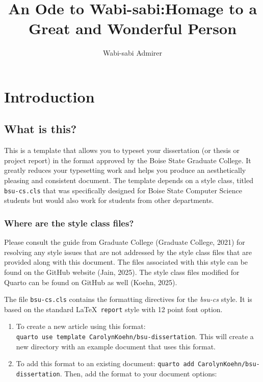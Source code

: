 \documentclass[
  dissertation]{bsu-cs}
\title{An Ode to Wabi-sabi:\titleBreak Homage to a Great and Wonderful
Person}
\author{Wabi-sabi Admirer}
\providecommand{\tightlist}{%
  \setlength{\itemsep}{0pt}\setlength{\parskip}{0pt}}\usepackage{longtable,booktabs,array}
\begin{document}
\frontmatter

\buildFrontPages










\mainmatter

\chapter{Introduction} \label{ch-intro}

\section{What is this?}\label{what-is-this}

This is a template that allows you to typeset your dissertation (or
thesis or project report) in the format approved by the Boise State
Graduate College. It greatly reduces your typesetting work and helps you
produce an aesthetically pleasing and consistent document. The template
depends on a style class, titled \texttt{bsu-cs.cls} that was
specifically designed for Boise State Computer Science students but
would also work for students from other departments.

\subsection{Where are the style class
files?}\label{where-are-the-style-class-files}

Please consult the guide from Graduate College (Graduate College, 2021)
for resolving any style issues that are not addressed by the style class
files that are provided along with this document. The files associated
with this style can be found on the GitHub website (Jain, 2025). The
style class files modified for Quarto can be found on GitHub as well
(Koehn, 2025).

The file \texttt{bsu-cs.cls} contains the formatting directives for the
\emph{bsu-cs} style. It is based on the standard \LaTeX~\texttt{report}
style with 12 point font option.

\begin{enumerate}
\def\labelenumi{\arabic{enumi}.}
\tightlist
\item
  To create a new article using this format:
  \texttt{quarto\ use\ template\ CarolynKoehn/bsu-dissertation}. This
  will create a new directory with an example document that uses this
  format.
\item
  To add this format to an existing document:
  \texttt{quarto\ add\ CarolynKoehn/bsu-dissertation}. Then, add the
  format to your document options:
\end{enumerate}
\end{document}

